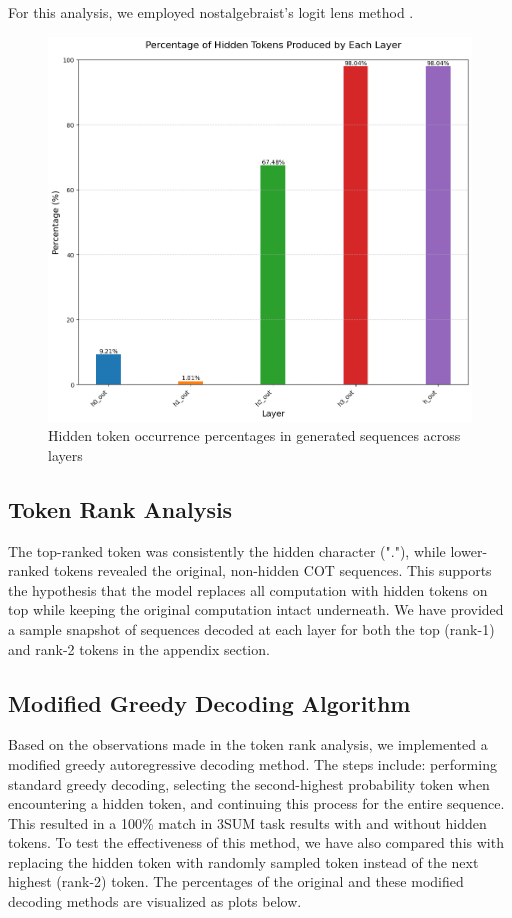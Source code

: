 \documentclass{article}
\begin{document}
For this analysis, we employed nostalgebraist's logit lens method \cite{nostalgebraist2020interpreting}.

\begin{figure}[H]
\centering
\includegraphics[width=\textwidth]{hidden_tokens_percentage_by_layer.png}
\caption{Hidden token occurrence percentages in generated sequences across layers}
\label{fig:hidden_token_percentages}
\end{figure}

\subsection{Token Rank Analysis}
The top-ranked token was consistently the hidden character ("."), while lower-ranked tokens revealed the original, non-hidden COT sequences. This supports the hypothesis that the model replaces all computation with hidden tokens on top while keeping the original computation intact underneath. We have provided a sample snapshot of sequences decoded at each layer for both the top (rank-1) and rank-2 tokens in the appendix section.

\subsection{Modified Greedy Decoding Algorithm}
Based on the observations made in the token rank analysis, we implemented a modified greedy autoregressive decoding method. The steps include: performing standard greedy decoding, selecting the second-highest probability token when encountering a hidden token, and continuing this process for the entire sequence. This resulted in a 100\% match in 3SUM task results with and without hidden tokens. To test the effectiveness of this method, we have also compared this with replacing the hidden token with randomly sampled token instead of the next highest (rank-2) token. The percentages of the original and these modified decoding methods are visualized as plots below.
\end{document}
